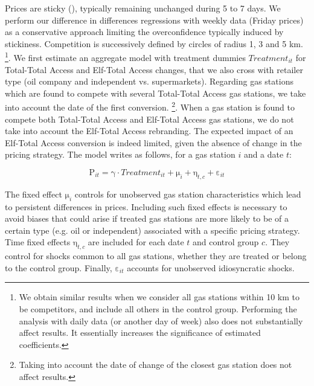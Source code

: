 \documentclass[english]{article}
\begin{document}
Prices are sticky (\cite{GAU15}), typically remaining unchanged during 5 to 7 days. We perform our difference in differences regressions with weekly data (Friday prices) as a conservative approach
limiting the overconfidence typically induced by stickiness. Competition is successively defined by circles of radius 1, 3 and 5 km.%
\footnote{We obtain similar results when we consider all gas stations within 10 km to be competitors, and include all others in the control group. Performing the analysis with daily data (or another day of week)
also does not substantially affect results. It essentially increases the significance of estimated coefficients.%
}. We first estimate an aggregate model with treatment dummies $Treatment_{it}$ for Total-Total Access and Elf-Total Access changes, that we also cross with retailer type (oil company and independent vs. supermarkets). Regarding gas stations which are found to compete with several Total-Total Access gas stations, we take into account the date of the first conversion.%
\footnote{Taking into account the date of change of the closest gas station does not affect results.%
}. When a gas station is found to compete both Total-Total Access and Elf-Total Access gas stations, we do not take into account the Elf-Total Access rebranding. The expected impact of an Elf-Total Access conversion is indeed limited, given the absence of change in the pricing strategy. The model writes as follows, for a gas station $i$ and a date $t$:

\begin{equation}
\mathrm{P}_{it}=\mathrm{\gamma}\cdot Treatment_{it}+\mathrm{\mu}_{i}+\mathrm{\eta}_{t,c}+\mathrm{\varepsilon}_{it}\label{eq:1}
\end{equation}

\medskip{}

The fixed effect $\mathrm{\mu}_{i}$ controls for unobserved gas station characteristics which lead to persistent differences in prices. Including such fixed effects is necessary to avoid biases that could arise if treated gas stations are more likely to be of a certain type (e.g. oil or independent) associated with a specific pricing strategy. Time fixed effects $\mathrm{\eta}_{t,c}$ are included for each date $t$ and control group $c$. They control for shocks common to all gas stations, whether they are treated or belong to the control group. Finally, $\mathrm{\varepsilon}_{it}$ accounts for unobserved idiosyncratic shocks.
\medskip{}
\end{document}
